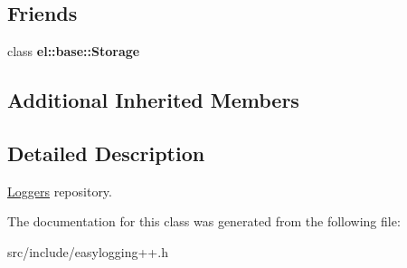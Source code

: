 \subsection*{Friends}
\begin{DoxyCompactItemize}
\item 
\mbox{\label{classel_1_1base_1_1_registered_loggers_acc1efd1b8a3fc5e0028dab98b02e550a}} 
class {\bfseries el\+::base\+::\+Storage}
\end{DoxyCompactItemize}
\subsection*{Additional Inherited Members}


\subsection{Detailed Description}
\hyperlink{classel_1_1_loggers}{Loggers} repository. 

The documentation for this class was generated from the following file\+:\begin{DoxyCompactItemize}
\item 
src/include/easylogging++.\+h\end{DoxyCompactItemize}
